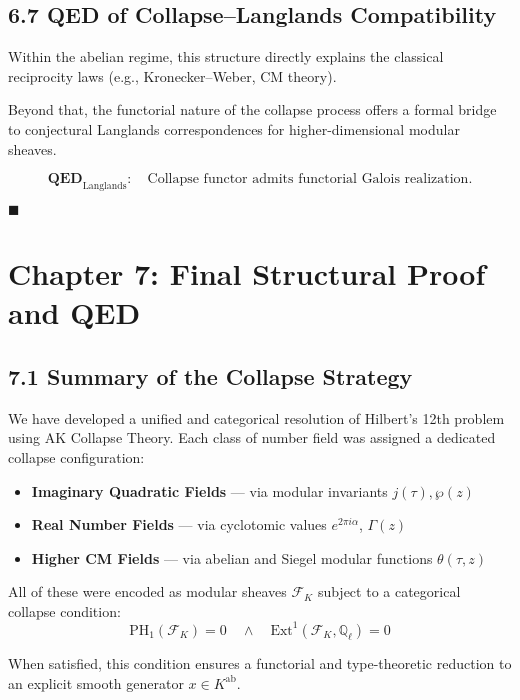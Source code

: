 \documentclass[11pt]{article}
\begin{document}
\subsection{6.7 QED of Collapse–Langlands Compatibility}

Within the abelian regime, this structure directly explains the classical reciprocity laws (e.g., Kronecker–Weber, CM theory).

Beyond that, the functorial nature of the collapse process offers a formal bridge to conjectural Langlands correspondences for higher-dimensional modular sheaves.

\[
\textbf{QED}_{\mathrm{Langlands}}: \quad \text{Collapse functor admits functorial Galois realization.}
\]

\hfill $\blacksquare$



\section{Chapter 7: Final Structural Proof and QED}

\subsection{7.1 Summary of the Collapse Strategy}

We have developed a unified and categorical resolution of Hilbert's 12th problem using AK Collapse Theory.  
Each class of number field was assigned a dedicated collapse configuration:

\begin{itemize}
    \item \textbf{Imaginary Quadratic Fields} — via modular invariants \( j(\tau), \wp(z) \)
    \item \textbf{Real Number Fields} — via cyclotomic values \( e^{2\pi i \alpha} \), \( \Gamma(z) \)
    \item \textbf{Higher CM Fields} — via abelian and Siegel modular functions \( \theta(\tau, z) \)
\end{itemize}

All of these were encoded as modular sheaves \( \mathcal{F}_K \) subject to a categorical collapse condition:
\[
\mathrm{PH}_1(\mathcal{F}_K) = 0 \quad \wedge \quad \mathrm{Ext}^1(\mathcal{F}_K, \mathbb{Q}_\ell) = 0
\]

When satisfied, this condition ensures a functorial and type-theoretic reduction to an explicit smooth generator \( x \in K^{\mathrm{ab}} \).
\end{document}
